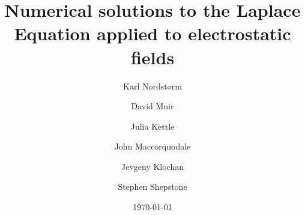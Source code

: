 \documentclass[aps,twocolumn,pre,nofootinbib,10pt]{revtex4-1}
\begin{document}

\newcommand{\breite}{1.0} %


\newtheorem{prop}{Proposition}
\newtheorem{cor}{Corollary}

\newcommand{\be}{\begin{equation}}
\newcommand{\ee}{\end{equation}}

\newcommand{\bea}{\begin{eqnarray}}
\newcommand{\eea}{\end{eqnarray}}

\newcommand{\Reals}{\mathbb{R}}     %
\newcommand{\Int}{\mathbb{Z}}       %
\newcommand{\Com}{\mathbb{C}}       %
\newcommand{\Nat}{\mathbb{N}}       %


\newcommand{\id}{\mathbbm{1}}    

\newcommand{\Real}{\mathop{\mathrm{Re}}}
\newcommand{\Imag}{\mathop{\mathrm{Im}}}

\def\O{\mbox{$\mathcal{O}$}}    
\def\F{\mathcal{F}}			
\def\sgn{\text{sgn}}

\newcommand{\dw}{\ensuremath{\Delta}} %
\newcommand{\wbp}{\ensuremath{\omega_0}}
\newcommand{\dv}{\ensuremath{\delta}}
\newcommand{\vbp}{\ensuremath{\nu_0}}
\newcommand{\vplus}{\ensuremath{\nu_{+}}}
\newcommand{\vminus}{\ensuremath{\nu_{-}}}
\newcommand{\wplus}{\ensuremath{\omega_{+}}}
\newcommand{\wminus}{\ensuremath{\omega_{-}}}



\title{Numerical solutions to the Laplace Equation applied to electrostatic fields}


\author{Karl Nordstorm}

\author{David Muir}

\author{Julia Kettle}

\author{John Maccorquodale}

\author{Jevgeny Klochan}

\author{Stephen Shepstone}



\date{\today}
\end{document}
